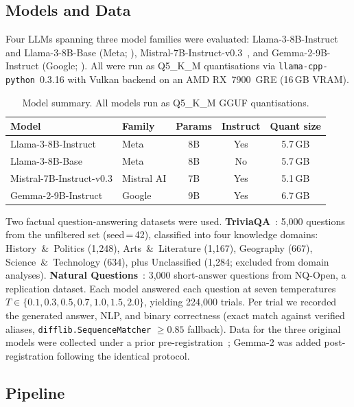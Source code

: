 \documentclass{article}
\begin{document}
\subsection{Models and Data}

Four LLMs spanning three model families were evaluated: Llama-3-8B-Instruct and Llama-3-8B-Base (Meta; \citealt{meta2024llama3}), Mistral-7B-Instruct-v0.3~\citep{jiang2023mistral}, and Gemma-2-9B-Instruct (Google; \citealt{team2024gemma2}). All were run as Q5\_K\_M quantisations via \texttt{llama-cpp-python}~0.3.16 with Vulkan backend on an AMD RX~7900~GRE (16\,GB VRAM).

\begin{table}[h]
\centering
\caption{Model summary. All models run as Q5\_K\_M GGUF quantisations.}
\label{tab:models}
\small
\begin{tabular}{llccc}
\toprule
\textbf{Model} & \textbf{Family} & \textbf{Params} & \textbf{Instruct} & \textbf{Quant size} \\
\midrule
Llama-3-8B-Instruct & Meta & 8B & Yes & 5.7\,GB \\
Llama-3-8B-Base & Meta & 8B & No & 5.7\,GB \\
Mistral-7B-Instruct-v0.3 & Mistral AI & 7B & Yes & 5.1\,GB \\
Gemma-2-9B-Instruct & Google & 9B & Yes & 6.7\,GB \\
\bottomrule
\end{tabular}
\end{table}

Two factual question-answering datasets were used. \textbf{TriviaQA}~\citep{joshi2017triviaqa}: 5{,}000 questions from the unfiltered set (seed\,=\,42), classified into four knowledge domains: History~\&~Politics (1{,}248), Arts~\&~Literature (1{,}167), Geography (667), Science~\&~Technology (634), plus Unclassified (1{,}284; excluded from domain analyses). \textbf{Natural Questions}~\citep{kwiatkowski2019natural}: 3{,}000 short-answer questions from NQ-Open, a replication dataset. Each model answered each question at seven temperatures $T \in \{0.1, 0.3, 0.5, 0.7, 1.0, 1.5, 2.0\}$, yielding 224{,}000 trials. Per trial we recorded the generated answer, NLP, and binary correctness (exact match against verified aliases, \texttt{difflib.SequenceMatcher} $\geq 0.85$ fallback). Data for the three original models were collected under a prior pre-registration~\citep{cacioli2026llms}; Gemma-2 was added post-registration following the identical protocol.

\subsection{Pipeline}
\label{sec:pipeline}
\end{document}
